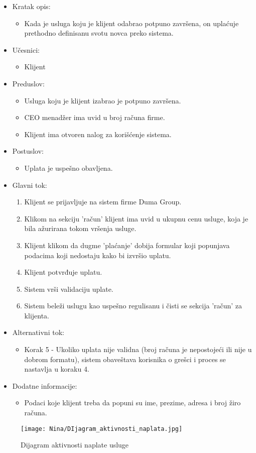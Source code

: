 \documentclass[a4paper]{article}
\begin{document}
\begin{itemize}
    \item Kratak opis: 
    \begin{itemize}
        \item Kada je usluga koju je klijent odabrao potpuno završena, on uplaćuje prethodno definisanu svotu novca preko sistema.
    \end{itemize}
    \item Učesnici:
        \begin{itemize}
        \item Klijent
    \end{itemize}
    \item Preduslov:
        \begin{itemize}
            \item Usluga koju je klijent izabrao je potpuno završena.
            \item CEO menadžer ima uvid u broj računa firme.
            \item Klijent ima otvoren nalog za korišćenje sistema.
        \end{itemize}
    \item Postuslov:
        \begin{itemize}
            \item Uplata je uspešno obavljena.
            \end{itemize}
    \item Glavni tok:
        \begin{enumerate}
            \item Klijent se prijavljuje na sistem firme Duma Group.
            \item Klikom na sekciju 'račun' klijent ima uvid u ukupnu cenu usluge, koja je bila ažurirana tokom vršenja usluge.
            \item Klijent klikom da dugme 'plaćanje' dobija formular koji popunjava podacima koji nedostaju kako bi izvršio uplatu.
            \item Klijent potvrđuje uplatu.
            \item Sistem vrši validaciju uplate.
            \item Sistem beleži uslugu kao uspešno regulisanu i čisti se sekcija 'račun' za klijenta.
        \end{enumerate}
    \item Alternativni tok:
        \begin{itemize}
            \item Korak 5 - Ukoliko uplata nije validna (broj računa je nepostojeći ili nije u dobrom formatu), sistem obaveštava korisnika o grešci i proces se nastavlja u koraku 4.  
    \end{itemize}
    \item Dodatne informacije:
        \begin{itemize}
            \item Podaci koje klijent treba da popuni su ime, prezime, adresa i broj žiro računa.
        \end{itemize}
\end{itemize}

\begin{figure}[H]
    \centering
    \texttt{[image: Nina/DIjagram\_aktivnosti\_naplata.jpg]}
    \caption{Dijagram aktivnosti naplate usluge}
    \label{fig:RegistracijaZ}
\end{figure}
\end{document}

